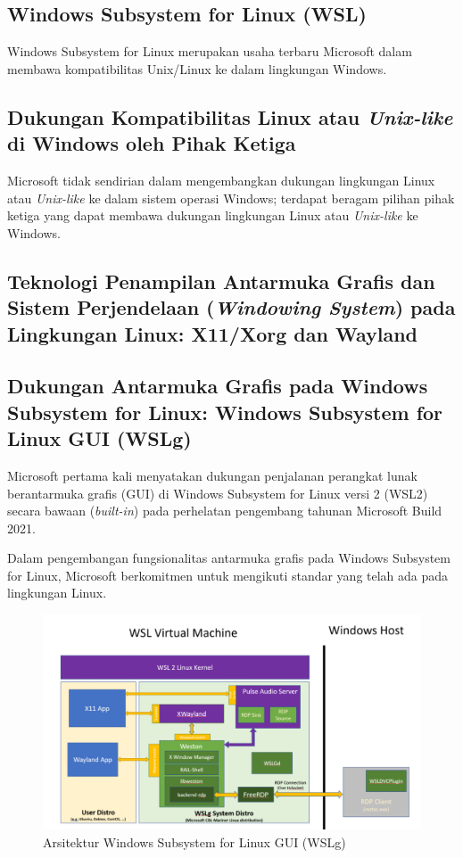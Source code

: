 \subsection{Windows Subsystem for Linux (WSL)}

Windows Subsystem for Linux merupakan usaha terbaru Microsoft dalam membawa kompatibilitas Unix/Linux ke dalam lingkungan Windows.

\subsection{Dukungan Kompatibilitas Linux atau \textit{Unix-like} di Windows oleh Pihak Ketiga}

Microsoft tidak sendirian dalam mengembangkan dukungan lingkungan Linux atau \textit{Unix-like} ke dalam sistem operasi Windows; terdapat beragam pilihan pihak ketiga yang dapat membawa dukungan lingkungan Linux atau \textit{Unix-like} ke Windows.

\subsection{Teknologi Penampilan Antarmuka Grafis dan Sistem Perjendelaan (\textit{Windowing System}) pada Lingkungan Linux: X11/Xorg dan Wayland}

\subsection{Dukungan Antarmuka Grafis pada Windows Subsystem for Linux: Windows Subsystem for Linux GUI (WSLg)}

Microsoft pertama kali menyatakan dukungan penjalanan perangkat lunak berantarmuka grafis (GUI) di Windows Subsystem for Linux versi 2 (WSL2) secara bawaan (\textit{built-in}) pada perhelatan pengembang tahunan Microsoft Build 2021.

Dalam pengembangan fungsionalitas antarmuka grafis pada Windows Subsystem for Linux, Microsoft berkomitmen untuk mengikuti standar yang telah ada pada lingkungan Linux.

\begin{figure}
    \centering
    \includegraphics[width=0.5\linewidth]{wslg-architecture.png}
    \caption{Arsitektur Windows Subsystem for Linux GUI (WSLg)}
    \label{fig:enter-label}
\end{figure}

